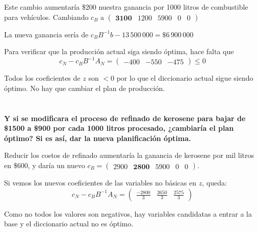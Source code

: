 \documentclass[10pt,a4paper]{article}
\begin{document}
\vspace{5mm}

Este cambio aumentaría \$200 nuestra ganancia por 1000 litros de combustible para vehículos. Cambiando $c_B$ a $\begin{pmatrix} \textbf{3100} & 1200 & 5900 & 0 & 0\end{pmatrix}$

La nueva ganancia sería de $c_B B^{-1} b - 13\,500\,000 = \$6\,900\,000$

Para verificar que la producción actual siga siendo óptima, hace falta que
\[
	c_N - c_B B^{-1} A_N = \begin{pmatrix} -400 & -550 & -475 \end{pmatrix} \leq 0
\]

Todos los coeficientes de $z$ son $< 0$ por lo que el diccionario actual sigue siendo óptimo. No hay que cambiar el plan de producción.

\section{} %
\textbf{Y si se modificara el proceso de refinado de kerosene para bajar de \$1500 a \$900 por cada 1000 litros procesado, ¿cambiaría el plan óptimo? Si es así, dar la nueva planificación óptima.}

\vspace{5mm}

Reducir los costos de refinado aumentaría la ganancia de kerosene por mil litros en \$600, y daría un nuevo $c_B = \begin{pmatrix}
	2900 & \textbf{2800} & 5900 & 0 & 0
\end{pmatrix}$.

Si vemos los nuevos coeficientes de las variables no básicas en $z$, queda:
\[
	c_N - c_B B^{-1} A_N = \begin{pmatrix}
		\frac{-2800}{3} & \frac{2650}{3} & \frac{2575}{3}
\end{pmatrix}
\]

Como no todos los valores son negativos, hay variables candidatas a entrar a la base y el diccionario actual no es óptimo. %
\end{document}
